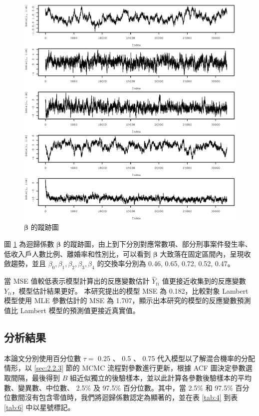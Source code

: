 \documentclass[12pt,a4paper]{article}
\begin{document}
\begin{CJK}{UTF8}{bkai}
\begin{figure}[H]
\centering
\includegraphics[width=1\textwidth]{beta_traceplot.eps}
\caption{$\bm{\beta}$ 的蹤跡圖}
\label{Fig.main5}
\end{figure}
圖 \ref{Fig.main5} 為迴歸係數 $\bm{\beta}$ 的蹤跡圖，由上到下分別對應常數項、部分刑事案件發生率、低收入戶人數比例、離婚率和性別比，可以看到 $\bm{\beta}$ 大致落在固定區間內，呈現收斂趨勢，並且 $\beta_0,\beta_1,\beta_2,\beta_3,\beta_4$ 的交換率分別為 0.46, 0.65, 0.72, 0.52, 0.47。

當 MSE 值較低表示模型計算出的反應變數估計 $\hat{Y}_{ti}$ 值更接近收集到的反應變數 $Y_{ti}$，模型估計結果更好。
本研究提出的模型 MSE 為 0.182，比較對象 Lambert 模型使用 MLE 參數估計的 MSE 為 1.707，顯示出本研究的模型的反應變數預測值比 Lambert 模型的預測值更接近真實值。



\subsection{分析結果}\label{sec:4.3}
本論文分別使用百分位數 $\tau =$ 0.25 、 0.5 、 0.75 代入模型以了解混合機率的分配情形，以 \ref{sec:2.2.3} 節的 MCMC 流程對參數進行更新，根據 ACF 圖決定參數選取間隔，最後得到 $B$ 組近似獨立的後驗樣本，並以此計算各參數後驗樣本的平均數、變異數、中位數、 2.5\% 及 97.5\% 百分位數。其中，當 2.5\% 和 97.5\% 百分位數間沒有包含零值時，我們將迴歸係數認定為顯著的，並在表 \ref{tab:4} 到表 \ref{tab:6} 中以星號標記。


\end{CJK}
\end{document}
